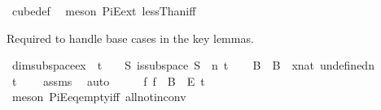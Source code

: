 \begin{isabellebody}
\ cube{\isacharunderscore}{\kern0pt}def\ \isamarkupfalse%
\ {\isacharparenleft}{\kern0pt}meson\ PiE{\isacharunderscore}{\kern0pt}ext\ lessThan{\isacharunderscore}{\kern0pt}iff{\isacharparenright}{\kern0pt}\isanewline
{}\isamarkupfalse%
%
\endisatagproof
{\isafoldproof}%
%
\isadelimproof
%
\endisadelimproof
%
\begin{isamarkuptext}%
Required to handle base cases in the key lemmas.%
\end{isamarkuptext}\isamarkuptrue%
\isamarkupfalse%
\ dim{}{\isacharunderscore}{\kern0pt}subspace{\isacharunderscore}{\kern0pt}ex{\isacharcolon}{\kern0pt}\ \ {\isachardoublequoteopen}t\ {\isachargreater}{\kern0pt}\ {}{\isachardoublequoteclose}\ \ {\isachardoublequoteopen}{\isasymexists}S{\isachardot}{\kern0pt}\ is{\isacharunderscore}{\kern0pt}subspace\ S\ {}\ n\ t{\isachardoublequoteclose}\isanewline
%
\isadelimproof
%
\endisadelimproof
%
\isatagproof
{}\isamarkupfalse%
{\isacharminus}{\kern0pt}\isanewline
\ \ \isamarkupfalse%
\ B\ \ {\isachardoublequoteopen}B\ {\isasymequiv}\ {\isacharparenleft}{\kern0pt}{\isasymlambda}x{\isacharcolon}{\kern0pt}{\isacharcolon}{\kern0pt}nat{\isachardot}{\kern0pt}\ undefined{\isacharparenright}{\kern0pt}{\isacharparenleft}{\kern0pt}{}{\isacharcolon}{\kern0pt}{\isacharequal}{\kern0pt}{\isacharbraceleft}{\kern0pt}{\isachardot}{\kern0pt}{\isachardot}{\kern0pt}{\isacharless}{\kern0pt}n{\isacharbraceright}{\kern0pt}{\isacharparenright}{\kern0pt}{\isachardoublequoteclose}\isanewline
\isanewline
\ \ \isamarkupfalse%
\ {\isachardoublequoteopen}{\isacharbraceleft}{\kern0pt}{\isachardot}{\kern0pt}{\isachardot}{\kern0pt}{\isacharless}{\kern0pt}t{\isacharbraceright}{\kern0pt}\ {\isasymnoteq}\ {\isacharbraceleft}{\kern0pt}{\isacharbraceright}{\kern0pt}{\isachardoublequoteclose}\ \isamarkupfalse%
\ assms\ \isamarkupfalse%
\ auto\isanewline
\ \ \isamarkupfalse%
\ \isamarkupfalse%
\ {\isachardoublequoteopen}{\isasymexists}f{\isachardot}{\kern0pt}\ f\ {\isasymin}\ {\isacharparenleft}{\kern0pt}B\ {}{\isacharparenright}{\kern0pt}\ {\isasymrightarrow}\isactrlsub E\ {\isacharbraceleft}{\kern0pt}{\isachardot}{\kern0pt}{\isachardot}{\kern0pt}{\isacharless}{\kern0pt}t{\isacharbraceright}{\kern0pt}{\isachardoublequoteclose}\ \isanewline
\ \ \ \ \isamarkupfalse%
\ {\isacharparenleft}{\kern0pt}meson\ PiE{\isacharunderscore}{\kern0pt}eq{\isacharunderscore}{\kern0pt}empty{\isacharunderscore}{\kern0pt}iff\ all{\isacharunderscore}{\kern0pt}not{\isacharunderscore}{\kern0pt}in{\isacharunderscore}{\kern0pt}conv{\isacharparenright}{\kern0pt}\isanewline

\end{isabellebody}
